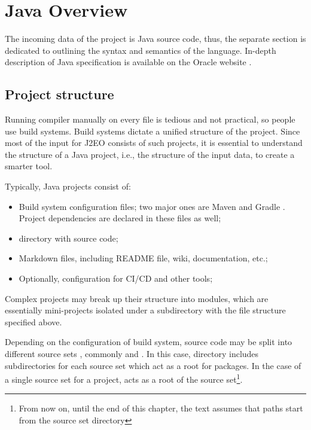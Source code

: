 \chapter{Java Overview}
\label{chapter:java_overview}

The incoming data of the project is Java source code, thus, the separate section is dedicated to outlining the syntax and semantics of the language. In-depth description of Java specification is available on the Oracle website \cite{java_specification}.


\section{Project structure}

Running compiler manually on every file is tedious and not practical, so people use build systems. Build systems dictate a unified structure of the project. Since most of the input for J2EO consists of such projects, it is essential to understand the structure of a Java project, i.e., the structure of the input data, to create a smarter tool.

Typically, Java projects consist of:
\begin{itemize}
    \item Build system configuration files; two major ones are Maven
        \cite{maven_repo} and Gradle \cite{gradle_repo}. Project dependencies
        are declared in these files as well;
    \item {} directory with source code;
    \item Markdown files, including README file, wiki, documentation, etc.;
    \item Optionally, configuration for CI/CD and other tools;
\end{itemize}

Complex projects may break up their structure into modules, which are
essentially mini-projects isolated under a subdirectory with the file structure specified above.

Depending on the configuration of build system, source code may be split into different source sets \cite{gradle_sourcesets}, commonly  and . In this case,  directory includes subdirectories for each source set which act as a root for
packages. In the case of a single source set for a project,  acts as a root of the source set\footnote[1]{From now on, until the end of this chapter, the text assumes that paths start from the source set directory}.

